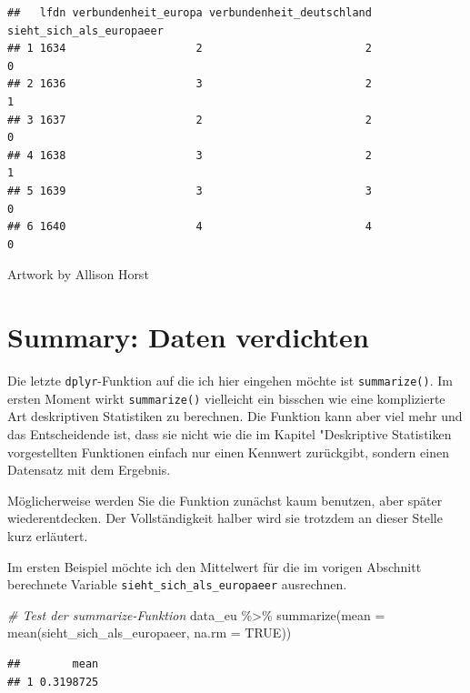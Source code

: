 \documentclass[
]{book}
\newenvironment{Shaded}{\begin{snugshade}}{\end{snugshade}}
\newcommand{\AttributeTok}[1]{\textcolor[rgb]{0.77,0.63,0.00}{#1}}
\newcommand{\CommentTok}[1]{\textcolor[rgb]{0.56,0.35,0.01}{\textit{#1}}}
\newcommand{\ConstantTok}[1]{\textcolor[rgb]{0.00,0.00,0.00}{#1}}
\newcommand{\FunctionTok}[1]{\textcolor[rgb]{0.00,0.00,0.00}{#1}}
\newcommand{\NormalTok}[1]{#1}
\newcommand{\SpecialCharTok}[1]{\textcolor[rgb]{0.00,0.00,0.00}{#1}}
\begin{document}
\begin{verbatim}
##   lfdn verbundenheit_europa verbundenheit_deutschland sieht_sich_als_europaeer
## 1 1634                    2                         2                        0
## 2 1636                    3                         2                        1
## 3 1637                    2                         2                        0
## 4 1638                    3                         2                        1
## 5 1639                    3                         3                        0
## 6 1640                    4                         4                        0
\end{verbatim}

Artwork by Allison Horst

\hypertarget{summary-daten-verdichten}{%
\section{Summary: Daten verdichten}\label{summary-daten-verdichten}}

Die letzte \texttt{dplyr}-Funktion auf die ich hier eingehen möchte ist \texttt{summarize()}. Im ersten Moment wirkt \texttt{summarize()} vielleicht ein bisschen wie eine komplizierte Art deskriptiven Statistiken zu berechnen. Die Funktion kann aber viel mehr und das Entscheidende ist, dass sie nicht wie die im Kapitel "Deskriptive Statistiken vorgestellten Funktionen einfach nur einen Kennwert zurückgibt, sondern einen Datensatz mit dem Ergebnis.

Möglicherweise werden Sie die Funktion zunächst kaum benutzen, aber später wiederentdecken. Der Vollständigkeit halber wird sie trotzdem an dieser Stelle kurz erläutert.

Im ersten Beispiel möchte ich den Mittelwert für die im vorigen Abschnitt berechnete Variable \texttt{sieht\_sich\_als\_europaeer} ausrechnen.

\begin{Shaded}
\begin{Highlighting}[]
\CommentTok{\# Test der summarize{-}Funktion}
\NormalTok{data\_eu }\SpecialCharTok{\%\textgreater{}\%} 
  \FunctionTok{summarize}\NormalTok{(}\AttributeTok{mean =} \FunctionTok{mean}\NormalTok{(sieht\_sich\_als\_europaeer, }\AttributeTok{na.rm =} \ConstantTok{TRUE}\NormalTok{))}
\end{Highlighting}
\end{Shaded}

\begin{verbatim}
##        mean
## 1 0.3198725
\end{verbatim}
\end{document}
